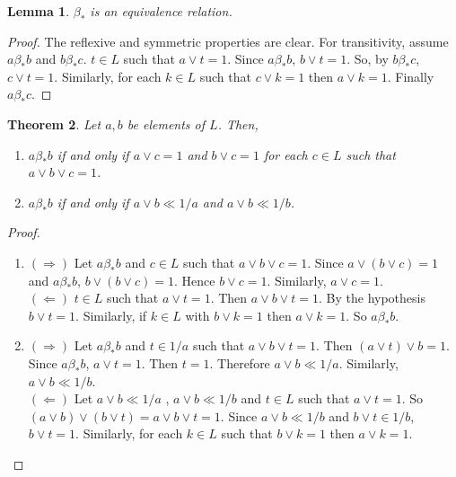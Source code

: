 \documentclass[a4paper,12pt]{article}
\newtheorem{theorem}{Theorem}[section]
\newtheorem{lemma}[theorem]{Lemma}
\numberwithin{equation}{section}
\begin{document}
\begin{lemma} \label{2}
  $ \beta_* $ is an equivalence relation.
\end{lemma}
\begin{proof}
  The reflexive and symmetric properties are clear. For transitivity, assume $ a \beta_*b $ and $ b \beta_* c $. 
  $ t \in L $ such that $ a \vee t = 1 $. Since $ a \beta_*b $, $ b \vee t = 1 $. So,  by $ b \beta_* c $, 
  $ c \vee t = 1 $. Similarly, for each $ k \in L $ such that $ c \vee k = 1 $ then $ a \vee k=1 $. 
  Finally $ a \beta_* c $.

\end{proof}

\begin{theorem} \label{3}
  Let $ a,b $ be elements of $ L $. Then,
  \begin{enumerate}[label=(\roman{*}), ref=(\roman{*})]

    \item
      $ a \beta_* b $ if and only if $ a \vee c = 1 $ and $ b \vee c = 1 $ for each $ c \in L $ 
      such that $ a \vee b  \vee c = 1 $.  \label{3.1}

    \item
      $ a \beta_* b $ if and only if $ a \vee b \ll 1/a $ and $ a \vee b \ll 1/b $.  \label{3.2}

  \end{enumerate}
\end{theorem}


\begin{proof}
  \begin{enumerate}
    \item
      $ ( \Rightarrow ) $
      Let $ a \beta_* b$ and $ c \in L $ such that $ a \vee b \vee c = 1 $. Since $ a \vee ( b \vee c ) = 1 $ and 
      $ a \beta_* b $, $ b \vee ( b \vee c ) = 1 $. Hence $ b \vee c = 1 $. Similarly, $ a \vee c = 1 $. \\
      $( \Leftarrow )$
      $ t \in L $ such that $ a \vee t = 1 $. 
      Then $ a \vee b \vee t = 1 $. By the hypothesis $ b \vee t = 1 $. 
      Similarly, if $ k \in L $ with $ b \vee k = 1 $ then $ a \vee k = 1 $. So $ a \beta_* b $.
    \item
      $ ( \Rightarrow ) $
      Let $ a \beta_* b $ and $ t \in 1/a $ such that $ a \vee b \vee t = 1 $. 
      Then $ ( a \vee t ) \vee b = 1 $. Since $ a \beta_* b $, $ a \vee t = 1 $. 
      Then $ t=1 $. Therefore $ a \vee b \ll 1/a $. Similarly, $ a \vee b \ll 1/b $. \\
      $( \Leftarrow )$
      Let $ a \vee b \ll 1/a $ , $ a \vee b \ll 1/b $ and $ t \in L $ such that $ a \vee t = 1 $. 
      So $ ( a \vee b ) \vee ( b \vee t ) = a \vee b \vee t = 1 $. Since $ a \vee b \ll 1/b $ and 
      $ b \vee t \in 1/b $, $ b \vee t = 1 $. 
      Similarly, for each $ k \in L $ such that $ b \vee k = 1 $ then $ a \vee k = 1 $. 
  \end{enumerate}
\end{proof}
\end{document}
